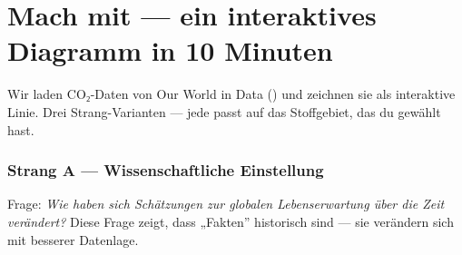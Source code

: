 \documentclass[
  ngerman,
  a4paper,
  DIV=11]{scrreprt}
\begin{document}
\section{Mach mit --- ein interaktives Diagramm in 10
Minuten}\label{mach-mit-ein-interaktives-diagramm-in-10-minuten}

Wir laden CO₂-Daten von Our World in Data () und zeichnen sie als interaktive Linie. Drei
Strang-Varianten --- jede passt auf das Stoffgebiet, das du gewählt
hast.

\subsubsection{Strang A --- Wissenschaftliche Einstellung}

Frage: \emph{Wie haben sich Schätzungen zur globalen Lebenserwartung
über die Zeit verändert?} Diese Frage zeigt, dass „Fakten'' historisch
sind --- sie verändern sich mit besserer Datenlage.
\end{document}

